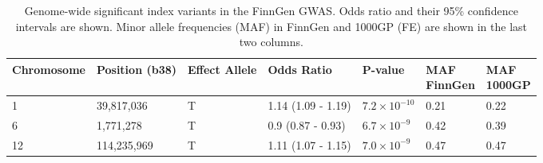 \begin{table}[htb]
  \centering\begingroup\fontsize{10}{12}\selectfont
  \caption[pAD-associated variants from the downloaded FinnGen GWAS summary statistics]{Genome-wide significant index variants in the FinnGen GWAS. Odds ratio and their 95\% confidence intervals are shown. Minor allele frequencies (MAF) in FinnGen and 1000GP (FE) are shown in the last two columns.}
  \label{table:gws_finngen}
  \begin{tabular}[t]{|l|l|l|l|l|l|l|}
  \hline
  Chromosome & Position (b38) & Effect Allele & Odds Ratio & P-value & \makecell{MAF\\ FinnGen} & \makecell{MAF\\ 1000GP}\\
  \hline
  1 & 39,817,036 & T & 1.14 (1.09 - 1.19) & $7.2\times10^{-10}$ & 0.21 & 0.22\\
  \hline
  6 & 1,771,278 & T & 0.9 (0.87 - 0.93) & $6.7\times10^{-9}$ & 0.42 & 0.39\\
  \hline
  12 & 114,235,969 & T & 1.11 (1.07 - 1.15) & $7.0\times10^{-9}$ & 0.47 & 0.47\\
  \hline
  \end{tabular}
  \endgroup{}
  \end{table}


